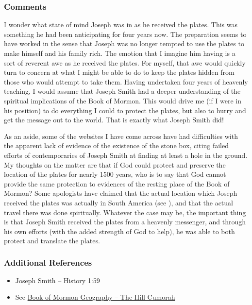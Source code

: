 \documentclass[12pt]{report}
\begin{document}
\subsubsection{Comments\label{js:comments22}}
I wonder what state of mind Joseph was in as he received the plates.  This was something he had been anticipating for four years now.  The preparation seems to have worked in the sense that Joseph was no longer tempted to use the plates to make himself and his family rich.  The emotion that I imagine him having is a sort of reverent awe as he received the plates.  For myself, that awe would quickly turn to concern at what I might be able to do to keep the plates hidden from those who would attempt to take them.  Having undertaken four years of heavenly teaching, I would assume that Joseph Smith had a deeper understanding of the spiritual implications of the Book of Mormon.  This would drive me (if I were in his position) to do everything I could to protect the plates, but also to hurry and get the message out to the world.  That is exactly what Joseph Smith did!

As an aside, some of the websites I have come across have had difficulties with the apparent lack of evidence of the existence of the stone box, citing failed efforts of contemporaries of Joseph Smith at finding at least a hole in the ground.  My thoughts on the matter are that if God could protect and preserve the location of the plates for nearly 1500 years, who is to say that God cannot provide the same protection to evidences of the resting place of the Book of Mormon?  Some apologists have claimed that the actual location which Joseph received the plates was actually in South America (see ), and that the actual travel there was done spiritually.  Whatever the case may be, the important thing is that Joseph Smith received the plates from a heavenly messenger, and through his own efforts (with the added strength of God to help), he was able to both protect and translate the plates.

\subsubsection{Additional References\label{js:references22}}
\begin{itemize}
\item Joseph Smith -- History 1:59
\item See \href{https://www.fairmormon.org/answers/Book_of_Mormon/Geography/New_World/Hill_Cumorah}{Book of Mormon Geography -- The Hill Cumorah}
\end{itemize}
\end{document}
